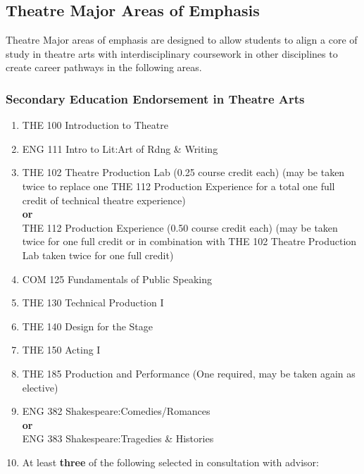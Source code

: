 \documentclass[
  letterpaper,
]{scrbook}
\providecommand{\tightlist}{%
  \setlength{\itemsep}{0pt}\setlength{\parskip}{0pt}}
\begin{document}
\subsection{Theatre Major Areas of
Emphasis}\label{theatre-major-areas-of-emphasis}

Theatre Major areas of emphasis are designed to allow students to align
a core of study in theatre arts with interdisciplinary coursework in
other disciplines to create career pathways in the following areas.

\subsubsection{Secondary Education Endorsement in Theatre
Arts}\label{secondary-education-endorsement-in-theatre-arts}

\begin{enumerate}
\def\labelenumi{\arabic{enumi}.}
\tightlist
\item
  THE 100 Introduction to Theatre\\
\item
  ENG 111 Intro to Lit:Art of Rdng \& Writing\\
\item
  THE 102 Theatre Production Lab (0.25 course credit each) (may be taken
  twice to replace one THE 112 Production Experience for a total one
  full credit of technical theatre experience)\\
  \textbf{or}\\
  THE 112 Production Experience (0.50 course credit each) (may be taken
  twice for one full credit or in combination with THE 102 Theatre
  Production Lab taken twice for one full credit)\\
\item
  COM 125 Fundamentals of Public Speaking\\
\item
  THE 130 Technical Production I\\
\item
  THE 140 Design for the Stage\\
\item
  THE 150 Acting I\\
\item
  THE 185 Production and Performance (One required, may be taken again
  as elective)\\
\item
  ENG 382 Shakespeare:Comedies/Romances\\
  \textbf{or}\\
  ENG 383 Shakespeare:Tragedies \& Histories\\
\item
  At least \textbf{three} of the following selected in consultation with
  advisor:


\end{enumerate}
\end{document}
